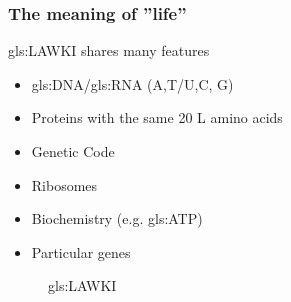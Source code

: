 \documentclass[]{article}
\begin{document}
\subsubsection{The meaning of ''life''}
\gls{gls:LAWKI} shares many features
\begin{itemize}
	\item \gls{gls:DNA}/\gls{gls:RNA} (A,T/U,C, G)
	\item Proteins with the same 20 L amino acids
	\item Genetic Code
	\item Ribosomes
	\item Biochemistry (e.g. \gls{gls:ATP})
	\item Particular genes
\end{itemize}

\begin{figure}[H]
	\caption{\acrfull{gls:LAWKI}}\label{fig:LUCA_figs} 
	

\end{figure}
\end{document}
